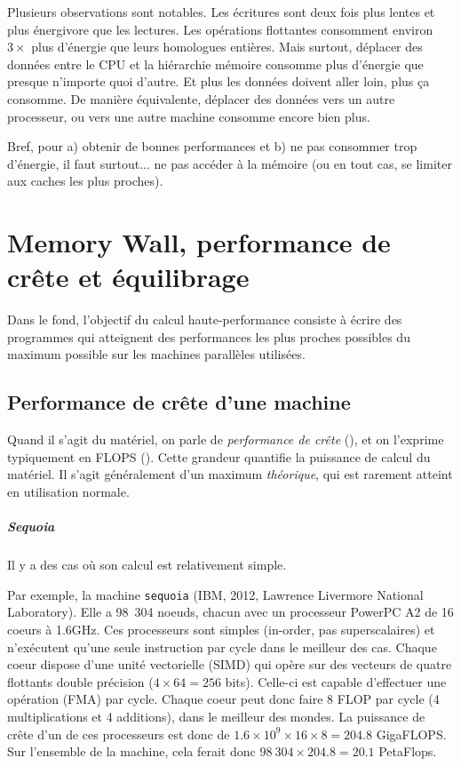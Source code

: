 Plusieurs observations sont notables. Les écritures sont deux fois plus lentes
et plus énergivore que les lectures. Les opérations flottantes consomment
environ $3\times$ plus d'énergie que leurs homologues entières. Mais surtout,
déplacer des données entre le CPU et la hiérarchie mémoire consomme plus
d'énergie que presque n'importe quoi d'autre. Et plus les données doivent aller
loin, plus ça consomme. De manière équivalente, déplacer des données vers un
autre processeur, ou vers une autre machine consomme encore bien plus.

Bref, pour a) obtenir de bonnes performances et b) ne pas consommer trop
d'énergie, il faut surtout... ne pas accéder à la mémoire (ou en tout cas, se
limiter aux caches les plus proches).

\chapter{\og Memory Wall\fg, performance de crête et équilibrage}
\label{ch:roofline}

Dans le fond, l'objectif du calcul haute-performance consiste à écrire des
programmes qui atteignent des performances les plus proches possibles du maximum
possible sur les machines parallèles utilisées.

\section{Performance de crête d'une machine}

Quand il s'agit du matériel, on parle de \emph{performance de crête}
(), et on l'exprime typiquement en FLOPS
(). Cette grandeur quantifie la
puissance de calcul du matériel. Il s'agit généralement d'un maximum
\emph{théorique}, qui est rarement atteint en utilisation normale.

\paragraph{Sequoia} Il y a des cas où son calcul est relativement simple.

Par exemple, la machine \texttt{sequoia} (IBM, 2012, Lawrence Livermore National
Laboratory). Elle a 98\ 304 noeuds, chacun avec un processeur PowerPC A2 de 16
coeurs à 1.6GHz. Ces processeurs sont simples (in-order, pas superscalaires) et
n'exécutent qu'une seule instruction par cycle dans le meilleur des cas. Chaque
coeur dispose d'une unité vectorielle (\og SIMD\fg) qui opère sur des vecteurs
de quatre flottants double précision ($4 \times 64 = 256$ bits). Celle-ci est
capable d'effectuer une opération \og {}\fg (FMA) par
cycle. Chaque coeur peut donc faire 8 FLOP par cycle (4 multiplications et 4
additions), dans le meilleur des mondes. La puissance de crête d'un de ces
processeurs est donc de $1.6 \times 10^9 \times 16 \times 8 = 204.8$
GigaFLOPS. Sur l'ensemble de la machine, cela ferait donc
$98\ 304 \times 204.8 = 20.1$ PetaFlops.

